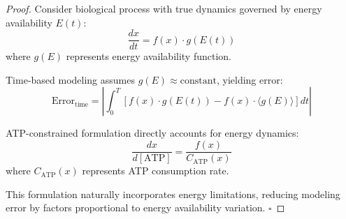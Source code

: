\documentclass[12pt,a4paper]{article}
\begin{document}
\begin{proof}
Consider biological process with true dynamics governed by energy availability $E(t)$:
\begin{equation}
\frac{dx}{dt} = f(x) \cdot g(E(t))
\end{equation}
where $g(E)$ represents energy availability function.

Time-based modeling assumes $g(E) \approx \text{constant}$, yielding error:
\begin{equation}
\text{Error}_{\text{time}} = \left|\int_0^T [f(x) \cdot g(E(t)) - f(x) \cdot \langle g(E) \rangle] dt\right|
\end{equation}

ATP-constrained formulation directly accounts for energy dynamics:
\begin{equation}
\frac{dx}{d[\text{ATP}]} = \frac{f(x)}{C_{\text{ATP}}(x)}
\end{equation}
where $C_{\text{ATP}}(x)$ represents ATP consumption rate.

This formulation naturally incorporates energy limitations, reducing modeling error by factors proportional to energy availability variation. $\square$
\end{proof}
\end{document}
